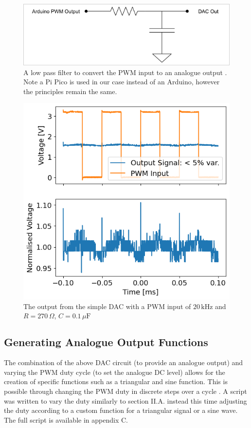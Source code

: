 \documentclass[%
 reprint,
 amsmath,amssymb,
 aps,
]{revtex4-2}
\begin{document}
    \begin{figure}
        \includegraphics[width=0.9\columnwidth]{Images/dac.png}
        \caption{\label{fig:DAC}A low pass filter to convert the PWM input to an analogue output \cite{ucd}. Note a Pi Pico is used in our case instead of an Arduino, however the principles remain the same.}
    \end{figure}
    \begin{figure}
        \includegraphics[width=0.9\columnwidth]{Images/dacVariations.png}
        \caption{\label{fig:dacVariations} The output from the simple DAC with a PWM input of $20\,\text{kHz}$ and $R=270\,\Omega$, $C=0.1\,\mu\text{F}$}
    \end{figure}

    \subsection{Generating Analogue Output Functions}
    The combination of the above DAC circuit (to provide an analogue output) and varying the PWM duty cycle (to set the analogue DC level) allows for the creation of specific functions such as a triangular and sine function. This is possible through changing the PWM duty in discrete steps over a cycle \cite{ucd}. A script was written to vary the duty similarly to section II.A. instead this time adjusting the duty according to a custom function for a triangular signal or a sine wave. The full script is available in appendix C.
\end{document}
